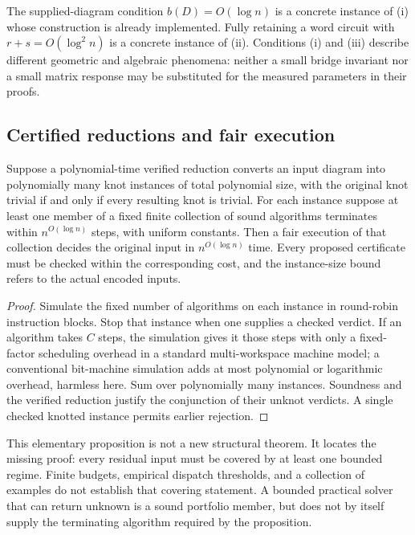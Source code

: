 The supplied-diagram condition $b(D)=O(\log n)$ is a concrete instance
of (i) whose construction is already implemented. Fully retaining a
word circuit with $r+s=O(\log^2 n)$ is a concrete instance of (ii).
Conditions (i) and (iii) describe different geometric and algebraic
phenomena: neither a small bridge invariant nor a small matrix response
may be substituted for the measured parameters in their proofs.

\subsection{Certified reductions and fair execution}

\begin{proposition}
\label{prop:portfolio}
Suppose a polynomial-time verified reduction converts an input diagram
into polynomially many knot instances of total polynomial size, with the
original knot trivial if and only if every resulting knot is trivial.
For each instance suppose at least one member of a fixed finite collection
of sound algorithms terminates within $n^{O(\log n)}$ steps, with uniform
constants. Then a fair execution of that collection decides the original
input in $n^{O(\log n)}$ time. Every proposed certificate must be checked
within the corresponding cost, and the instance-size bound refers to the
actual encoded inputs.
\end{proposition}

\begin{proof}
Simulate the fixed number of algorithms on each instance in round-robin
instruction blocks. Stop that instance when one supplies a checked
verdict. If an algorithm takes $C$ steps, the simulation gives it those
steps with only a fixed-factor scheduling overhead in a standard
multi-workspace machine model; a conventional bit-machine simulation
adds at most polynomial or logarithmic overhead, harmless here. Sum
over polynomially many instances. Soundness and the verified reduction
justify the conjunction of their unknot verdicts. A single checked
knotted instance permits earlier rejection.
\end{proof}

This elementary proposition is not a new structural theorem. It locates
the missing proof: every residual input must be covered by at least one
bounded regime. Finite budgets, empirical dispatch thresholds, and a
collection of examples do not establish that covering statement. A
bounded practical solver that can return unknown is a sound portfolio
member, but does not by itself supply the terminating algorithm required
by the proposition.


